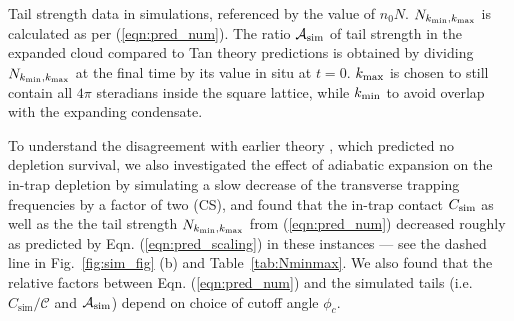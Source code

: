 \begin{table}
	\hfill
	\begin{minipage}{0.5\textwidth}
	\vspace{0pt}
	\caption{
	Tail strength data in simulations, referenced by the value of $n_0N$. $N_{k_{\rm min},k_{\rm max}}$ is calculated as per (\ref{eqn:pred_num}). The ratio $\mathcal{A}_{\rm sim}$ of tail strength  in the expanded cloud compared to Tan theory predictions is obtained by dividing $N_{k_{\rm min},k_{\rm max}}$  at the final time by its value in situ at $t=0$. $k_{\rm max}$ is chosen to still contain all $4\pi$ steradians inside the square lattice, while  $k_{\rm min}$ to avoid overlap with the expanding condensate.
	}
	\label{tab:Nminmax}
	\end{minipage}
	\end{table}

	To understand the disagreement with earlier theory \cite{Qu16}, which predicted no depletion survival, we also investigated the effect of adiabatic expansion on the in-trap depletion by simulating a slow decrease of the transverse trapping frequencies by a factor of two (CS), and found that the in-trap contact {$C_{\rm sim}$ as well as the the tail strength $N_{k_{\rm min},k_{\rm max}}$ from (\ref{eqn:pred_num})} 
	decreased roughly as predicted by Eqn. (\ref{eqn:pred_scaling}) in these instances --- see the dashed line in Fig.~\ref{fig:sim_fig} (b) {and Table~\ref{tab:Nminmax}.} 
	We also found that the relative factors between Eqn. (\ref{eqn:pred_num}) and the simulated tails (i.e. $C_\textrm{sim}/\mathcal{C}$ {and $\mathcal{A}_{\rm sim}$) depend} on choice of cutoff angle $\phi_c$. 
